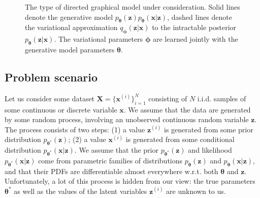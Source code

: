 \documentclass{article} %
\theoremstyle{definition}
\newcommand{\bb}[1]{\mathbf{#1}}
\newcommand{\bx}{\bb{x}}
\newcommand{\bxi}{\bx^{(i)}}
\newcommand{\bz}{\bb{z}}
\newcommand{\bzi}{\bz^{(i)}}
\newcommand{\bT}{\boldsymbol{\theta}}
\newcommand{\bphi}{\boldsymbol{\phi}}
\newcommand{\bX}{\bb{X}}
\newcommand{\pT}{p_{\bT}}
\newcommand{\qPhi}{q_{\bphi}}
\theoremstyle{definition}
\begin{document}
\begin{figure}[t]
\begin{center}
\end{center}
\caption{
The type of directed graphical model under consideration. Solid lines denote the generative model $\pT(\bz)\pT(\bx|\bz)$, dashed lines denote the variational approximation $\qPhi(\bz|\bx)$ to the intractable posterior $\pT(\bz|\bx)$. The variational parameters $\bphi$ are learned jointly with the generative model parameters $\bT$.
}
\end{figure}

\subsection{Problem scenario}
\label{sec:problem}
%
%
%

Let us consider some dataset $\bX = \{\bx^{(i)}\}_{i=1}^N$ consisting of $N$ i.i.d. samples of some continuous or discrete variable $\bx$. We assume that the data are generated by some random process, involving an unobserved continuous random variable $\bz$. The process consists of two steps: (1) a value $\bzi$ is generated from some prior distribution $p_{\bT^*}(\bz)$; (2) a value $\bxi$ is generated from some conditional distribution $p_{\bT^*}(\bx|\bz)$.  We assume that the prior $p_{\bT^*}(\bz)$ and likelihood $p_{\bT^*}(\bx|\bz)$ come from parametric families of distributions $\pT(\bz)$ and $\pT(\bx|\bz)$, and that their PDFs are differentiable almost everywhere w.r.t. both $\bT$ and $\bz$. Unfortunately, a lot of this process is hidden from our view: the true parameters $\bT^*$ as well as the values of the latent variables $\bzi$ are unknown to us.  
\end{document}
